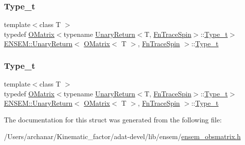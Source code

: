 \subsubsection{\texorpdfstring{Type\_t}{Type\_t}\hspace{0.1cm}{\footnotesize\ttfamily [2/3]}}
{\footnotesize\ttfamily template$<$class T $>$ \\
typedef \mbox{\hyperlink{classENSEM_1_1OMatrix}{O\+Matrix}}$<$typename \mbox{\hyperlink{structENSEM_1_1UnaryReturn}{Unary\+Return}}$<$T, \mbox{\hyperlink{structENSEM_1_1FnTraceSpin}{Fn\+Trace\+Spin}}$>$\+::\mbox{\hyperlink{structENSEM_1_1UnaryReturn_3_01OMatrix_3_01T_01_4_00_01FnTraceSpin_01_4_a9d6cbecc05de075e41d52fd0b7f2b55e}{Type\+\_\+t}}$>$ \mbox{\hyperlink{structENSEM_1_1UnaryReturn}{E\+N\+S\+E\+M\+::\+Unary\+Return}}$<$ \mbox{\hyperlink{classENSEM_1_1OMatrix}{O\+Matrix}}$<$ T $>$, \mbox{\hyperlink{structENSEM_1_1FnTraceSpin}{Fn\+Trace\+Spin}} $>$\+::\mbox{\hyperlink{structENSEM_1_1UnaryReturn_3_01OMatrix_3_01T_01_4_00_01FnTraceSpin_01_4_a9d6cbecc05de075e41d52fd0b7f2b55e}{Type\+\_\+t}}}

\mbox{\label{structENSEM_1_1UnaryReturn_3_01OMatrix_3_01T_01_4_00_01FnTraceSpin_01_4_a9d6cbecc05de075e41d52fd0b7f2b55e}} 
\subsubsection{\texorpdfstring{Type\_t}{Type\_t}\hspace{0.1cm}{\footnotesize\ttfamily [3/3]}}
{\footnotesize\ttfamily template$<$class T $>$ \\
typedef \mbox{\hyperlink{classENSEM_1_1OMatrix}{O\+Matrix}}$<$typename \mbox{\hyperlink{structENSEM_1_1UnaryReturn}{Unary\+Return}}$<$T, \mbox{\hyperlink{structENSEM_1_1FnTraceSpin}{Fn\+Trace\+Spin}}$>$\+::\mbox{\hyperlink{structENSEM_1_1UnaryReturn_3_01OMatrix_3_01T_01_4_00_01FnTraceSpin_01_4_a9d6cbecc05de075e41d52fd0b7f2b55e}{Type\+\_\+t}}$>$ \mbox{\hyperlink{structENSEM_1_1UnaryReturn}{E\+N\+S\+E\+M\+::\+Unary\+Return}}$<$ \mbox{\hyperlink{classENSEM_1_1OMatrix}{O\+Matrix}}$<$ T $>$, \mbox{\hyperlink{structENSEM_1_1FnTraceSpin}{Fn\+Trace\+Spin}} $>$\+::\mbox{\hyperlink{structENSEM_1_1UnaryReturn_3_01OMatrix_3_01T_01_4_00_01FnTraceSpin_01_4_a9d6cbecc05de075e41d52fd0b7f2b55e}{Type\+\_\+t}}}



The documentation for this struct was generated from the following file\+:\begin{DoxyCompactItemize}
\item 
/\+Users/archanar/\+Kinematic\+\_\+factor/adat-\/devel/lib/ensem/\mbox{\hyperlink{adat-devel_2lib_2ensem_2ensem__obsmatrix_8h}{ensem\+\_\+obsmatrix.\+h}}\end{DoxyCompactItemize}
